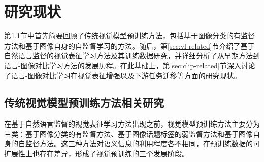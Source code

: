 \chapter{研究现状}
\label{cha:relate}
第\ref{sec:pt-related}节中首先简要回顾了传统视觉模型预训练方法，包括基于图像分类的有监督方法和基于图像自身的自监督学习的方法。随后，第\ref{sec:vl-related}节介绍了基于自然语言监督的视觉表征学习方法及其训练数据研究，并详细分析了从早期方法到语言-图像对比学习方法的发展历程。在此基础上，第\ref{sec:clip-related}节深入讨论了语言-图像对比学习在视觉表征增强以及下游任务迁移等方面的研究现状。


\section{传统视觉模型预训练方法相关研究}
\label{sec:pt-related}

在基于自然语言监督的视觉表征学习方法出现之前，视觉模型预训练方法主要分为三类：基于图像分类的有监督方法、基于图像话题标签的弱监督方法和基于图像自身的自监督方法。这三种方法对语义信息的利用程度各不相同，在预训练数据的可扩展性上也存在差异，形成了视觉预训练的三个发展阶段。 %


